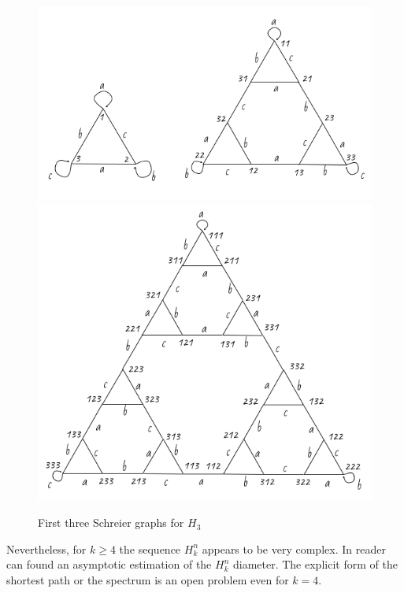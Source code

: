 \documentclass[a4paper,12pt]{amsart}
\begin{document}
\begin{figure}[h]
	\includegraphics[scale=0.36]{H3_12.png}
	\includegraphics[scale=0.36]{H3_3.png}
	\caption{First three Schreier graphs for $H_3$}
\end{figure}

\newpage

Nevertheless, for $k \ge 4$ the sequence $H_k^n$ appears to be very complex. In \cite{Hanoi1} reader can found an asymptotic estimation of the $H_k^n$ diameter. The explicit form of the shortest path or the spectrum is an open problem even for $k = 4$. 
\end{document}
